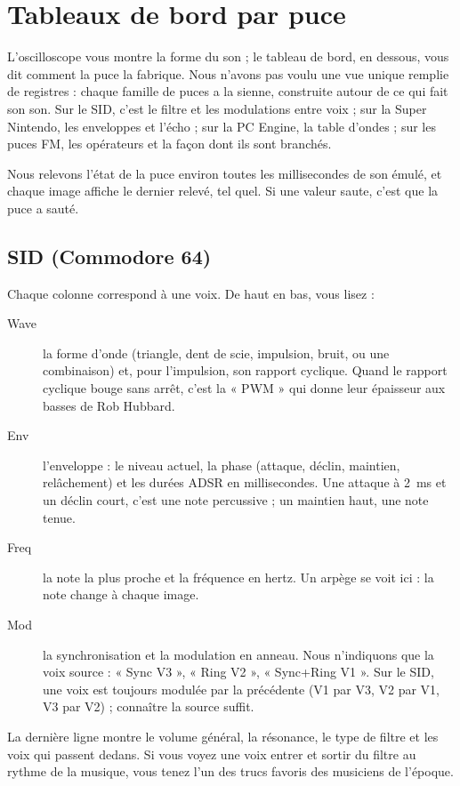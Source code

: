 \chapter{Tableaux de bord par puce}\label{chap:dashboards}

L'oscilloscope vous montre la forme du son ; le tableau de bord, en dessous, vous dit comment la puce la fabrique.
Nous n'avons pas voulu une vue unique remplie de registres : chaque famille de puces a la sienne, construite autour de
ce qui fait son son. Sur le SID, c'est le filtre et les modulations entre voix ; sur la Super Nintendo, les
enveloppes et l'écho ; sur la PC Engine, la table d'ondes ; sur les puces FM, les opérateurs et la façon dont ils
sont branchés.

Nous relevons l'état de la puce environ toutes les millisecondes de son émulé, et chaque image affiche le dernier
relevé, tel quel. Si une valeur saute, c'est que la puce a sauté.

\section{SID (Commodore 64)}
Chaque colonne correspond à une voix. De haut en bas, vous lisez :
\begin{description}
  \item[Wave] la forme d'onde (triangle, dent de scie, impulsion, bruit, ou une combinaison) et, pour l'impulsion,
        son rapport cyclique. Quand le rapport cyclique bouge sans arrêt, c'est la « PWM » qui donne leur
        épaisseur aux basses de Rob Hubbard.
  \item[Env] l'enveloppe : le niveau actuel, la phase (attaque, déclin, maintien, relâchement) et les durées ADSR en
        millisecondes. Une attaque à 2~ms et un déclin court, c'est une note percussive ; un maintien haut, une note
        tenue.
  \item[Freq] la note la plus proche et la fréquence en hertz. Un arpège se voit ici : la note change à chaque image.
  \item[Mod] la synchronisation et la modulation en anneau. Nous n'indiquons que la voix source : « Sync V3 »,
        « Ring V2 », « Sync+Ring V1 ». Sur le SID, une voix est toujours modulée par la précédente (V1 par V3, V2 par
        V1, V3 par V2) ; connaître la source suffit.
\end{description}
La dernière ligne montre le volume général, la résonance, le type de filtre et les voix qui passent dedans. Si vous
voyez une voix entrer et sortir du filtre au rythme de la musique, vous tenez l'un des trucs favoris des musiciens
de l'époque.

